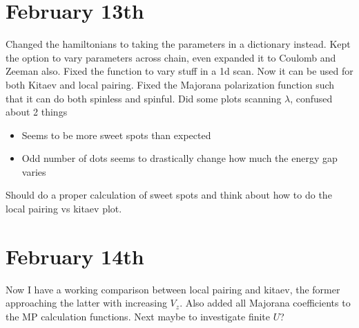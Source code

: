 \documentclass{article}
\begin{document}
\section*{February 13th}
Changed the hamiltonians to taking the parameters in a dictionary instead. Kept the option to vary parameters across chain, even expanded it to Coulomb and Zeeman also. Fixed the function to vary stuff in a 1d scan. Now it can be used for both Kitaev and local pairing. Fixed the Majorana polarization function such that it can do both spinless and spinful. Did some plots scanning $\lambda$, confused about 2 things
\begin{itemize}
    \item Seems to be more sweet spots than expected
    \item Odd number of dots seems to drastically change how much the energy gap varies
\end{itemize}
Should do a proper calculation of sweet spots and think about how to do the local pairing vs kitaev plot.
\section*{February 14th}
Now I have a working comparison between local pairing and kitaev, the former approaching the latter with increasing $V_z$. Also added all Majorana coefficients to the MP calculation functions. Next maybe to investigate finite $U$?
\end{document}

